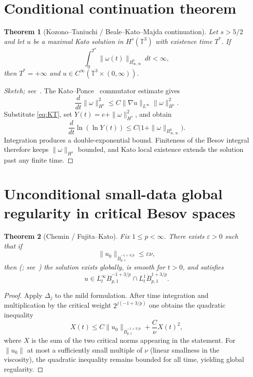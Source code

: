 \documentclass[11pt,a4paper]{article}
\newtheorem{theorem}{Theorem}[section]
\begin{document}
\section{Conditional continuation theorem}

\begin{theorem}[Kozono--Taniuchi / Beale--Kato--Majda continuation]
Let \(s>5/2\) and let \(u\) be a maximal Kato solution in \(H^s(\mathbb{T}^3)\) with existence time \(T^*\). If
\[
\int_0^{T^*}\|\omega(t)\|_{B^0_{\infty,\infty}}\,dt<\infty,
\]
then \(T^*=+\infty\) and \(u\in C^\infty(\mathbb{T}^3\times(0,\infty))\).
\end{theorem}

\begin{proof}[Sketch; see~\cite{BKM1984,KOT2002}]
The Kato--Ponce~\cite{KatoPonce1988} commutator estimate gives
\[
\frac{d}{dt}\|\omega\|_{H^s}^2\le C\|\nabla u\|_{L^\infty}\|\omega\|_{H^s}^2.
\]
Substitute \eqref{eq:KT}, set \(Y(t)=e+\|\omega\|_{H^s}^2\), and obtain
\[
\frac{d}{dt}\ln(\ln Y(t))\le C\bigl(1+\|\omega\|_{B^0_{\infty,\infty}}\bigr).
\]
Integration produces a double-exponential bound. Finiteness of the Besov integral therefore keeps \(\|\omega\|_{H^s}\) bounded, and Kato local existence extends the solution past any finite time.
\end{proof}

\section{Unconditional small-data global regularity in critical Besov spaces}

\begin{theorem}[Chemin / Fujita--Kato]
Fix \(1\le p<\infty\). There exists \(\varepsilon>0\) such that if
\[
\|u_0\|_{\dot{B}^{-1+3/p}_{p,1}}\le\varepsilon\nu,
\]
then (\cite{Chemin1992,FujitaKato1964}; see~\cite{BCD2011}) the solution exists globally, is smooth for \(t>0\), and satisfies
\[
u\in L^\infty_t\dot{B}^{-1+3/p}_{p,1}\cap L^1_t\dot{B}^{1+3/p}_{p,1}.
\]
\end{theorem}

\begin{proof}
Apply \(\Delta_j\) to the mild formulation. After time integration and multiplication by the critical weight \(2^{j(-1+3/p)}\) one obtains the quadratic inequality
\[
X(t)\le C\|u_0\|_{\dot{B}^{-1+3/p}_{p,1}}+\frac{C}{\nu}X(t)^2,
\]
where \(X\) is the sum of the two critical norms appearing in the statement. For \(\|u_0\|\) at most a sufficiently small multiple of \(\nu\) (linear smallness in the viscosity), the quadratic inequality remains bounded for all time, yielding global regularity.
\end{proof}
\end{document}
